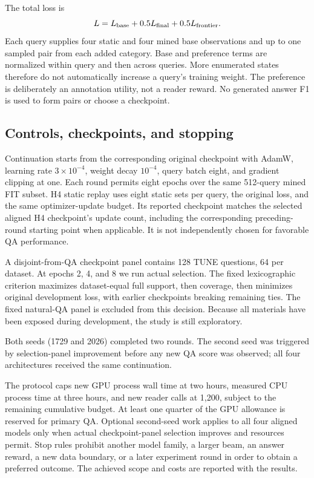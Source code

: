 \documentclass[pdflatex,sn-mathphys-num]{sn-jnl}
\begin{document}
The total loss is
\begin{equation}
L=L_{\rm base}+0.5L_{\rm final}+0.5L_{\rm frontier}.
\end{equation}
Each query supplies four static and four mined base observations and up to
one sampled pair from each added category. Base and preference terms are
normalized within query and then across queries. More enumerated states
therefore do not automatically increase a query's training weight.
The preference is deliberately an annotation utility, not a reader reward.
No generated answer F1 is used to form pairs or choose a checkpoint.

\subsection{Controls, checkpoints, and stopping}
Continuation starts from the corresponding original checkpoint with AdamW,
learning rate $3\times10^{-4}$, weight decay $10^{-4}$, query batch eight,
and gradient clipping at one. Each round permits eight epochs over the same
512-query mined FIT subset. H4 static replay uses eight static sets per
query, the original loss, and the same optimizer-update budget. Its reported
checkpoint matches the selected aligned H4 checkpoint's update count,
including the corresponding preceding-round starting point when applicable.
It is not independently chosen for favorable QA performance.

A disjoint-from-QA checkpoint panel contains 128 TUNE questions, 64 per
dataset. At epochs 2, 4, and 8 we run actual selection. The fixed
lexicographic criterion maximizes dataset-equal full support, then coverage,
then minimizes original development loss, with earlier checkpoints breaking
remaining ties. The fixed natural-QA panel is excluded from this decision.
Because all materials have been exposed during development, the study is
still exploratory.

Both seeds (1729 and 2026) completed two rounds. The second seed was
triggered by selection-panel improvement before any new QA score was
observed; all four architectures received the same continuation.

The protocol caps new GPU process wall time at two hours, measured CPU
process time at three hours, and new reader calls at 1,200, subject to the
remaining cumulative budget. At least one quarter of the GPU allowance is
reserved for primary QA. Optional second-seed work applies to all four
aligned models only when actual checkpoint-panel selection improves and
resources permit. Stop rules prohibit another model family, a larger beam,
an answer reward, a new data boundary, or a later experiment round in order
to obtain a preferred outcome. The achieved scope and costs are reported
with the results.
\end{document}

